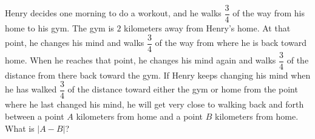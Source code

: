 Henry decides one morning to do a workout, and he walks $\dfrac{3}{4}$ of the way from his home to his gym. The gym is $2$ kilometers away from Henry's home. At that point, he changes his mind and walks $\dfrac{3}{4}$ of the way from where he is back toward home. When he reaches that point, he changes his mind again and walks $\dfrac{3}{4}$ of the distance from there back toward the gym. If Henry keeps changing his mind when he has walked $\dfrac{3}{4}$ of the distance toward either the gym or home from the point where he last changed his mind, he will get very close to walking back and forth between a point $A$ kilometers from home and a point $B$ kilometers from home. What is $|A-B|$?
